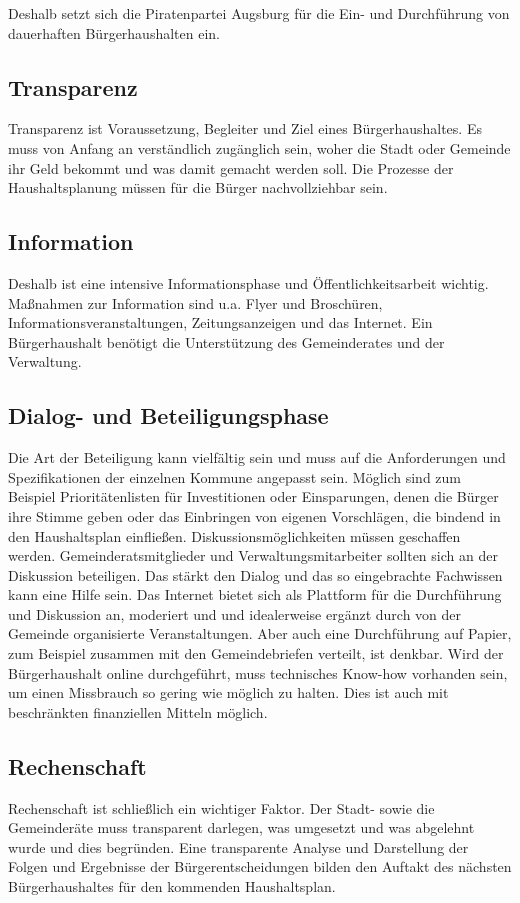   Deshalb setzt sich die Piratenpartei Augsburg für die Ein- und Durchführung 
  von dauerhaften Bürgerhaushalten ein.
  
  \subsection{Transparenz}
  
  Transparenz ist Voraussetzung, Begleiter und Ziel eines Bürgerhaushaltes. Es 
  muss von Anfang an verständlich zugänglich sein, woher die Stadt oder 
  Gemeinde ihr Geld bekommt und was damit gemacht werden soll. Die Prozesse 
  der Haushaltsplanung müssen für die Bürger nachvollziehbar sein.
  
  \subsection{Information}
  
  Deshalb ist eine intensive Informationsphase und Öffentlichkeitsarbeit 
  wichtig. Maßnahmen zur Information sind u.a. Flyer und Broschüren, 
  Informationsveranstaltungen, Zeitungsanzeigen und das Internet. Ein 
  Bürgerhaushalt benötigt die Unterstützung des Gemeinderates und der 
  Verwaltung.
  
  \subsection{Dialog- und Beteiligungsphase}
  
  Die Art der Beteiligung kann vielfältig sein und muss auf die Anforderungen 
  und Spezifikationen der einzelnen Kommune angepasst sein. Möglich sind zum 
  Beispiel Prioritätenlisten für Investitionen oder Einsparungen, denen die 
  Bürger ihre Stimme geben oder das Einbringen von eigenen Vorschlägen, die 
  bindend in den Haushaltsplan einfließen. Diskussionsmöglichkeiten müssen 
  geschaffen werden. Gemeinderatsmitglieder und Verwaltungsmitarbeiter sollten 
  sich an der Diskussion beteiligen. Das stärkt den Dialog und das so 
  eingebrachte Fachwissen kann eine Hilfe sein. Das Internet bietet sich als 
  Plattform für die Durchführung und Diskussion an, moderiert und und 
  idealerweise ergänzt durch von der Gemeinde organisierte Veranstaltungen. 
  Aber auch eine Durchführung auf Papier, zum Beispiel zusammen mit den 
  Gemeindebriefen verteilt, ist denkbar. Wird der Bürgerhaushalt online 
  durchgeführt, muss technisches Know-how vorhanden sein, um einen Missbrauch 
  so gering wie möglich zu halten. Dies ist auch mit beschränkten finanziellen 
  Mitteln möglich.
  
  \subsection{Rechenschaft}
  
  Rechenschaft ist schließlich ein wichtiger Faktor. Der Stadt- sowie die 
  Gemeinderäte muss transparent darlegen, was umgesetzt und was abgelehnt 
  wurde und dies begründen. Eine transparente Analyse und Darstellung der 
  Folgen und Ergebnisse der Bürgerentscheidungen bilden den Auftakt des 
  nächsten Bürgerhaushaltes für den kommenden Haushaltsplan.
